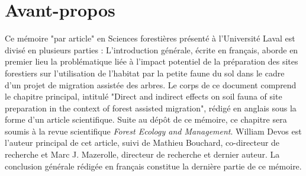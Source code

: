 \chapter*{Avant-propos}         %
\label{chap-avantpropos}        %


Ce mémoire "par article" en Sciences forestières présenté à l'Université Laval est divisé en plusieurs parties : 
L'introduction générale, écrite en français, aborde en premier lieu la problématique liée à l'impact potentiel de la préparation des sites forestiers sur 
l'utilisation de l'habitat par la petite faune du sol dans le cadre d'un projet de migration assistée des arbres.
Le corps de ce document comprend le chapitre principal, intitulé 
"Direct and indirect effects on soil fauna of site preparation in the context of forest assisted migration", rédigé en anglais sous la forme d'un article scientifique. 
Suite au dépôt de ce mémoire, ce chapitre sera soumis à la revue scientifique \textit{Forest Ecology and Management}. 
William Devos est l'auteur principal de cet article, suivi de Mathieu Bouchard, co-directeur de recherche et Marc J. Mazerolle, directeur de recherche et dernier auteur.
La conclusion générale rédigée en français constitue la dernière partie de ce mémoire.
